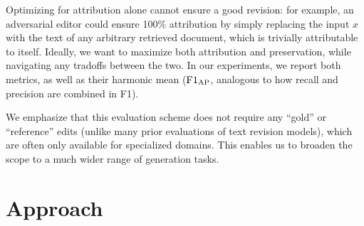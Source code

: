 \documentclass[11pt]{article}
\begin{document}
Optimizing for attribution alone cannot ensure a good revision: for example, an adversarial editor could ensure 100\% attribution by simply replacing the input $x$ with the text of any arbitrary retrieved document, which is trivially attributable to itself.
Ideally, we want to maximize both attribution and preservation, while navigating any tradoffs between the two.
In our experiments, we report both metrics, as well as their harmonic mean ($\text{F1}_\text{AP}{}$, analogous to how recall and precision are combined in F1).


We emphasize that this evaluation scheme does not require any ``gold'' or ``reference'' edits (unlike many prior evaluations of text revision models), which are often only available for specialized domains. This enables us to broaden the scope to a much wider range of generation tasks.


\section{Approach}\label{section:approach}


\newcommand{\promptin}[1]{\textcolor{blue!70!black}{{#1}}}
\newcommand{\promptout}[1]{\textcolor{red!70!black}{{\ul{#1}}}}
\end{document}
